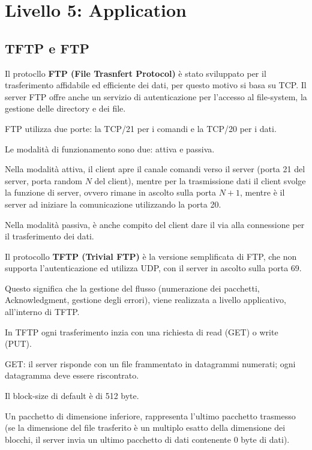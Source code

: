 \section{Livello 5: Application}
    \subsection{TFTP e FTP}
        Il protocllo \textbf{FTP (File Trasnfert Protocol)} è stato sviluppato per il trasferimento affidabile ed efficiente dei dati, per questo motivo si basa su TCP. Il server FTP offre anche un servizio di autenticazione per l'accesso al file-system, la gestione delle directory e dei file.
    
        FTP utilizza due porte: la TCP/21 per i comandi e la TCP/20 per i dati.
    
        Le modalità di funzionamento sono due: attiva e passiva.

        Nella modalità attiva, il client apre il canale comandi verso il server (porta 21 del server, porta random $N$ del client), mentre per la trasmissione dati il client svolge la funzione di server, ovvero rimane in ascolto sulla porta $N + 1$, mentre è il server ad iniziare la comunicazione utilizzando la porta 20.

        Nella modalità passiva, è anche compito del client dare il via alla connessione per il trasferimento dei dati.

        Il protocollo \textbf{TFTP (Trivial FTP)} è la versione semplificata di FTP, che non supporta l'autenticazione ed utilizza UDP, con il server in ascolto sulla porta 69.

        Questo significa che la gestione del flusso (numerazione dei pacchetti, Acknowledgment, gestione degli errori), viene realizzata a livello applicativo, all'interno di TFTP.

        In TFTP ogni trasferimento inzia con una richiesta di read (GET) o write (PUT).

        GET: il server risponde con un file frammentato in datagrammi numerati; ogni datagramma deve essere riscontrato.

        Il block-size di default è di 512 byte.

        Un pacchetto di dimensione inferiore, rappresenta l'ultimo pacchetto trasmesso (se la dimensione del file trasferito è un multiplo esatto della dimensione dei blocchi, il server invia un ultimo pacchetto di dati contenente 0 byte di dati).

